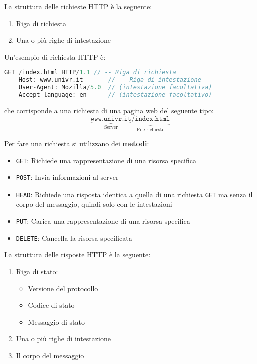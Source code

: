 \documentclass[a4paper]{article}
\begin{document}
\vspace{1em}
\noindent
La struttura delle richieste HTTP è la seguente:
\begin{enumerate}
  \item Riga di richiesta
  \item Una o più righe di intestazione
\end{enumerate}

\begin{example}
  Un'esempio di richiesta HTTP è:
  \begin{lstlisting}[language=Scala]
    GET /index.html HTTP/1.1 // -- Riga di richiesta
    Host: www.univr.it       // -- Riga di intestazione
    User-Agent: Mozilla/5.0  // (intestazione facoltativa)
    Accept-language: en      // (intestazione facoltativo)
  \end{lstlisting}
  che corrisponde a una richiesta di una pagina web del seguente tipo:
  \[
    \underbrace{\texttt{www.univr.it}}_{\text{Server}} 
      \underbrace{\texttt{/index.html}}_{\text{File richiesto}}
  \]
  \label{http-request}
\end{example}

\noindent
Per fare una richiesta si utilizzano dei \textbf{metodi}:
\begin{itemize}
  \item \texttt{GET}: Richiede una rappresentazione di una risorsa specifica
  \item \texttt{POST}: Invia informazioni al server
  \item \texttt{HEAD}: Richiede una risposta identica a quella di una richiesta \texttt{GET}
    ma senza il corpo del messaggio, quindi solo con le intestazioni
  \item \texttt{PUT}: Carica una rappresentazione di una risorsa specifica
  \item \texttt{DELETE}: Cancella la risorsa specificata
\end{itemize}

\vspace{1em}
\noindent
La struttura delle risposte HTTP è la seguente:
\begin{enumerate}
  \item Riga di stato:
    \begin{itemize}
      \item Versione del protocollo
      \item Codice di stato
      \item Messaggio di stato
    \end{itemize}
  \item Una o più righe di intestazione
  \item Il corpo del messaggio
\end{enumerate}
\end{document}
